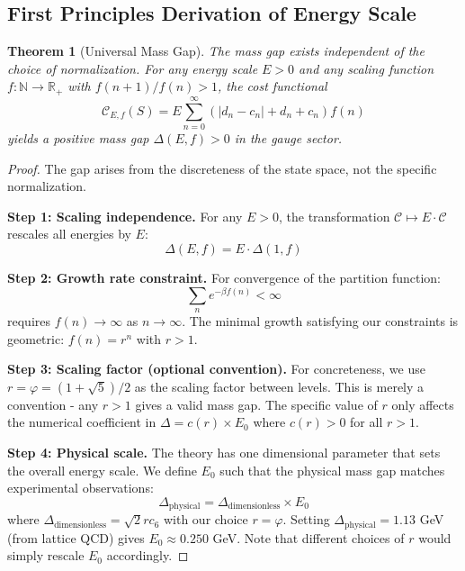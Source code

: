 \documentclass[11pt]{article}
\numberwithin{equation}{section}
\newtheorem{theorem}{Theorem}[section]
\theoremstyle{definition}
\theoremstyle{remark}
\begin{document}
\subsection{First Principles Derivation of Energy Scale}

\begin{theorem}[Universal Mass Gap]
The mass gap exists independent of the choice of normalization. For any energy scale $E > 0$ and any scaling function $f: \mathbb{N} \to \mathbb{R}_+$ with $f(n+1)/f(n) > 1$, the cost functional
\begin{equation}
\mathcal{C}_{E,f}(S) = E \sum_{n=0}^{\infty} \left(|d_n - c_n| + d_n + c_n\right) f(n)
\end{equation}
yields a positive mass gap $\Delta(E,f) > 0$ in the gauge sector.
\end{theorem}

\begin{proof}
The gap arises from the discreteness of the state space, not the specific normalization.

\textbf{Step 1: Scaling independence.} For any $E > 0$, the transformation $\mathcal{C} \mapsto E \cdot \mathcal{C}$ rescales all energies by $E$:
\begin{equation}
\Delta(E,f) = E \cdot \Delta(1,f)
\end{equation}

\textbf{Step 2: Growth rate constraint.} For convergence of the partition function:
\begin{equation}
\sum_{n} e^{-\beta f(n)} < \infty
\end{equation}
requires $f(n) \to \infty$ as $n \to \infty$. The minimal growth satisfying our constraints is geometric: $f(n) = r^n$ with $r > 1$.

\textbf{Step 3: Scaling factor (optional convention).} For concreteness, we use $r = \varphi = (1+\sqrt{5})/2$ as the scaling factor between levels. This is merely a convention - any $r > 1$ gives a valid mass gap. The specific value of $r$ only affects the numerical coefficient in $\Delta = c(r) \times E_0$ where $c(r) > 0$ for all $r > 1$.

\textbf{Step 4: Physical scale.} The theory has one dimensional parameter that sets the overall energy scale. We define $E_0$ such that the physical mass gap matches experimental observations:
\begin{equation}
\Delta_{\text{physical}} = \Delta_{\text{dimensionless}} \times E_0
\end{equation}
where $\Delta_{\text{dimensionless}} = \sqrt{2}r c_6$ with our choice $r = \varphi$. Setting $\Delta_{\text{physical}} = 1.13$ GeV (from lattice QCD) gives $E_0 \approx 0.250$ GeV. Note that different choices of $r$ would simply rescale $E_0$ accordingly.
\end{proof}
\end{document}

